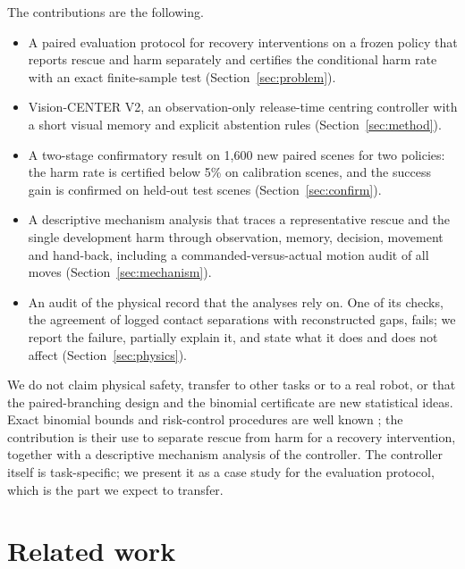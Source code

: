 \documentclass[preprint,12pt]{elsarticle}
\begin{document}
The contributions are the following.
\begin{itemize}
\item A paired evaluation protocol for recovery interventions on a frozen policy that reports rescue and harm separately and certifies the conditional harm rate with an exact finite-sample test (Section~\ref{sec:problem}).
\item Vision-CENTER V2, an observation-only release-time centring controller with a short visual memory and explicit abstention rules (Section~\ref{sec:method}).
\item A two-stage confirmatory result on 1,600 new paired scenes for two policies: the harm rate is certified below 5\% on calibration scenes, and the success gain is confirmed on held-out test scenes (Section~\ref{sec:confirm}).
\item A descriptive mechanism analysis that traces a representative rescue and the single development harm through observation, memory, decision, movement and hand-back, including a commanded-versus-actual motion audit of all moves (Section~\ref{sec:mechanism}).
\item An audit of the physical record that the analyses rely on. One of its checks, the agreement of logged contact separations with reconstructed gaps, fails; we report the failure, partially explain it, and state what it does and does not affect (Section~\ref{sec:physics}).
\end{itemize}

We do not claim physical safety, transfer to other tasks or to a real robot, or that the paired-branching design and the binomial certificate are new statistical ideas. Exact binomial bounds and risk-control procedures are well known \cite{clopper1934,angelopoulos2021ltt}; the contribution is their use to separate rescue from harm for a recovery intervention, together with a descriptive mechanism analysis of the controller. The controller itself is task-specific; we present it as a case study for the evaluation protocol, which is the part we expect to transfer.

\section{Related work}\label{sec:related}
\end{document}
